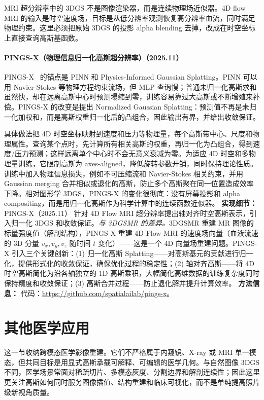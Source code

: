 MRI 超分辨率中的 3DGS 不是图像渲染器，而是连续物理场近似器。4D flow MRI 的输入是时空速度场，目标是从低分辨率观测恢复高分辨率血流，同时满足物理约束。这里必须把原始 3DGS 的投影 alpha blending 去掉，改成在时空坐标上直接查询高斯基函数。
\paragraph{PINGS-X（物理信息归一化高斯超分辨率）（2025.11）}
PINGS-X~\cite{2511_11048} 的锚点是 PINN 和 Physics-Informed Gaussian Splatting。PINN 可以用 Navier-Stokes 等物理方程约束流场，但 MLP 查询慢；普通未归一化高斯求和虽然快，却在远离高斯中心时预测塌缩到零，训练容易靠过大高斯或不断增殖来补偿。PINGS-X 的改变是提出 Normalized Gaussian Splatting：预测值不再是未归一化加权和，而是高斯权重归一化后的凸组合，因此输出有界，并给出收敛保证。

具体做法把 4D 时空坐标映射到速度和压力等物理量，每个高斯带中心、尺度和物理属性。查询某个点时，先计算所有相关高斯的权重，再归一化为凸组合，得到速度/压力预测；这样远离单个中心时不会无意义衰减为零。为适应 4D 时空和多物理量训练，它限制高斯为 axes-aligned，降低旋转参数开销，同时保持理论性质。训练中加入物理信息损失，例如不可压缩流和 Navier-Stokes 相关约束，并用 Gaussian merging 合并相似或退化的高斯，防止多个高斯聚在同一位置造成效率下降。相对图形学 3DGS，PINGS-X 的变化很彻底：没有屏幕投影和 alpha compositing，而是用归一化高斯作为科学计算中的连续函数近似器。
\textbf{实现细节：} PINGS-X（2025.11） 针对 4D Flow MRI 超分辨率提出轴对齐时空高斯表示，引入归一化 3DGS 和收敛保证。\textit{与 3DGSMR 的差异。}3DGSMR 重建 MR 图像的标量强度值（解剖结构），PINGS-X 重建 4D Flow MRI 的速度场向量（血液流速的 3D 分量 $v_x, v_y, v_z$ 随时间 $t$ 变化）——这是一个 4D 向量场重建问题。PINGS-X 引入三个关键创新：(1) 归一化高斯 Splatting——对高斯基元的贡献进行归一化，提供形式化的收敛保证，确保优化过程的稳定性；(2) 轴对齐高斯——将 4D 时空高斯简化为沿各轴独立的 1D 高斯乘积，大幅简化高维数据的训练复杂度同时保持精度和收敛保证；(3) 高斯合并过程——防止退化解并提升计算效率。
\textbf{方法信息：} 代码：\url{https://github.com/spatialailab/pings-x}。
\section{其他医学应用}

这一节收纳跨模态医学影像重建。它们不严格属于内窥镜、X-ray 或 MRI 单一模态，但共同目标是用显式高斯承载可解释、可编辑的医学几何。与自然图像 3DGS 不同，医学场景常面对稀疏切片、多模态灰度、分割边界和解剖连续性；因此这里更关注高斯如何同时服务图像插值、结构重建和临床可视化，而不是单纯提高照片级新视角质量。


